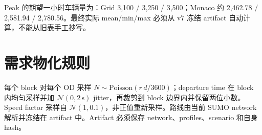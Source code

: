 Peak 的期望一小时车辆量为：Grid 3,100 / 3,250 / 3,500；Monaco 约 2,462.78 / 2,581.94 / 2,780.56。最终实际 mean/min/max 必须从 v7 冻结 artifact 自动计算，不能从旧表手工抄写。

\section{需求物化规则}
每个 block 对每个 OD 采样 $N\sim\mathrm{Poisson}(r\,d/3600)$；departure time 在 block 内均匀采样并加 $\mathcal{N}(0,2\,\mathrm{s})$ jitter，再裁剪到 block 边界内并保留两位小数。Speed factor 采样自 $\mathcal{N}(1,0.1)$，非正值重新采样。路线由当前 SUMO network 解析并冻结在 artifact 中。Artifact 必须保存 network、profiles、scenario 和自身 hash。
